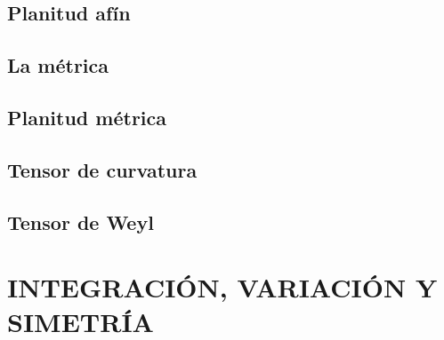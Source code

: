 \documentclass[../main]{subfiles}
\begin{document}
\section{Planitud afín}

\section{La métrica}

\section{Planitud métrica}

\section{Tensor de curvatura}

\section{Tensor de Weyl}

\newpage
\chapter{INTEGRACIÓN, VARIACIÓN Y SIMETRÍA}


\newpage
\end{document}
